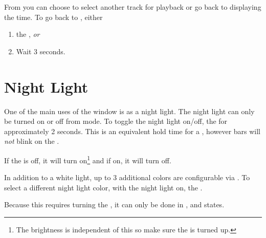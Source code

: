 From  you can choose to select another track for playback or go back
to displaying the time.  To go back to , either

\begin{enumerate}
  \item {} the , \textit{or}
  \item Wait \num{3} seconds.
\end{enumerate}

\section{Night Light} \label{Night Light}

One of the main uses of the  window is as a night light. The night
light can only be turned on or off from  mode.  To toggle the night
light on\slash off,  the  for approximately \num{2} seconds.
This is an equivalent hold time for a , however bars will \textit{not}
blink on the .


If the  is off, it will turn on\footnote{ The brightness is independent
of this so make sure the  is turned up.} and if on, it will turn off.


In addition to a white light, up to \num{3} additional colors are configurable
via \hyperref[Set Night Light]{}.  To select a different night light
color, with the night light on,  the .

\par\medskip

Because this requires turning the , it can only be done in ,
 and  states.


